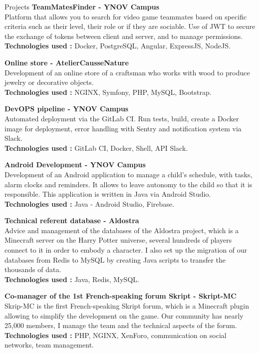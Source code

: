 \documentclass[
	10pt, %
]{resume}
\begin{document}
\begin{rSection}{Projects}
	{\bf TeamMatesFinder - YNOV Campus}
	\\ Platform that allows you to search for video game teammates based on specific criteria such as their level, their role or if they are sociable. Use of JWT to secure the exchange of tokens between client and server, and to manage permissions.
	\\ \textbf{Technologies used :} Docker, PostgreSQL, Angular, ExpressJS, NodeJS.

	{\bf Online store - AtelierCausseNature}
	\\ Development of an online store of a craftsman who works with wood to produce jewelry or decorative objects.
	\\ \textbf{Technologies used :} NGINX, Symfony, PHP, MySQL, Bootstrap.

	{\bf DevOPS pipeline - YNOV Campus}
	\\ Automated deployment via the GitLab CI. Run tests, build, create a Docker image for deployment, error handling with Sentry and notification system via Slack.
	\\ \textbf{Technologies used : }GitLab CI, Docker, Shell, API Slack.

	{\bf Android Development - YNOV Campus}
	\\ Development of an Android application to manage a child’s schedule, with tasks, alarm clocks and reminders. 
	It allows to leave autonomy to the child so that it is responsible. This application is written in Java via Android Studio.
	\\ \textbf{Technologies used :} Java - Android Studio, Firebase.

	{\bf Technical referent database - Aldostra}
	\\ Advice and management of the databases of the Aldostra project, which is a Minecraft server on the Harry Potter universe, several hundreds of players 
	connect to it in order to embody a character. I also set up the migration of our databases from Redis to MySQL by creating Java scripts to transfer the thousands of data.
	\\ \textbf{Technologies used :} Java, Redis, MySQL.

	{\bf Co-manager of the 1st French-speaking forum Skript - Skript-MC}
	\\ Skrip-MC is the first French-speaking Skript forum, which is a Minecraft plugin allowing to simplify the development on the game. 
	Our community has nearly 25,000 members, I manage the team and the technical aspects of the forum.
	\\ \textbf{Technologies used :} PHP, NGINX, XenForo, communication on social networks, team management.


\end{rSection}
\end{document}
